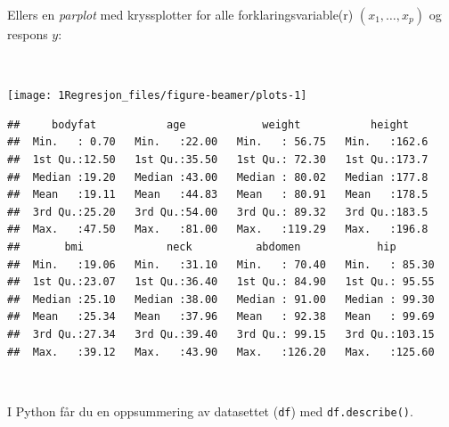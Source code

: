 \documentclass[10pt,ignorenonframetext,]{beamer}
\begin{document}
\begin{frame}

Ellers en \emph{parplot} med kryssplotter for alle
forklaringsvariable(r) \((x_1,\ldots, x_p)\) og respons \(y\):

\(~\)

\begin{center}\texttt{[image: 1Regresjon\_files/figure-beamer/plots-1]} \end{center}

\end{frame}

\begin{frame}[fragile]

\scriptsize

\begin{verbatim}
##     bodyfat           age            weight           height     
##  Min.   : 0.70   Min.   :22.00   Min.   : 56.75   Min.   :162.6  
##  1st Qu.:12.50   1st Qu.:35.50   1st Qu.: 72.30   1st Qu.:173.7  
##  Median :19.20   Median :43.00   Median : 80.02   Median :177.8  
##  Mean   :19.11   Mean   :44.83   Mean   : 80.91   Mean   :178.5  
##  3rd Qu.:25.20   3rd Qu.:54.00   3rd Qu.: 89.32   3rd Qu.:183.5  
##  Max.   :47.50   Max.   :81.00   Max.   :119.29   Max.   :196.8  
##       bmi             neck          abdomen            hip        
##  Min.   :19.06   Min.   :31.10   Min.   : 70.40   Min.   : 85.30  
##  1st Qu.:23.07   1st Qu.:36.40   1st Qu.: 84.90   1st Qu.: 95.55  
##  Median :25.10   Median :38.00   Median : 91.00   Median : 99.30  
##  Mean   :25.34   Mean   :37.96   Mean   : 92.38   Mean   : 99.69  
##  3rd Qu.:27.34   3rd Qu.:39.40   3rd Qu.: 99.15   3rd Qu.:103.15  
##  Max.   :39.12   Max.   :43.90   Max.   :126.20   Max.   :125.60
\end{verbatim}

\(~\)

\normalsize

I Python får du en oppsummering av datasettet (\texttt{df}) med
\texttt{df.describe()}.

\end{frame}
\end{document}
